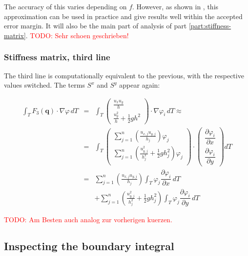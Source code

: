 \documentclass{article}
\newcommand{\todo}[2][]{\textcolor{red}{TODO\ifthenelse{\equal{#1}{}}{}{[#1]}: #2}}
\newcommand{\pd}[2]{\dfrac{\partial #1}{\partial #2}}
\renewcommand{\phi}{\varphi}
\begin{document}
The accuracy of this varies depending on $f$. However, as shown in \cite{cockburn1999discontinuous}, this approximation can be used in practice and give results well within the accepted error margin. It will also be the main part of analysis of part \ref{part:stiffness-matrix}.
\todo{Sehr schoen geschrieben!}

\subsubsection{Stiffness matrix, third line}

The third line is computationally equivalent to the previous, with the respective values switched. The terms $S^x$ and $S^y$ appear again:

\begin{eqnarray*}
  \int_T F_3\left(\mathbf{q}\right) \cdot \nabla \phi \, dT & = &
  \int_T
  \begin{pmatrix}
    \frac{u_x u_y}{h} \\ \frac{u_y^2}{h} + \frac{1}{2} g h^2
  \end{pmatrix}
  \cdot \nabla \phi_i \, dT \approx \\
  & = & \int_T
  \begin{pmatrix}
    \sum_{j=1}^n \left(\frac{u_{x,j} u_{y,j}}{h_j}\right) \phi_j \\
    \sum_{j=1}^n \left(\frac{u_{y,j}^2}{h_j^2} + \frac{1}{2} g h_j^2\right) \phi_j \\
  \end{pmatrix}
  \cdot
  \begin{pmatrix}
    \pd{\phi_i}{x} \\
    \pd{\phi_i}{y}
  \end{pmatrix} dT \\
  & = & \sum_{j=1}^n \left(\frac{u_{x,j} u_{y,j}}{h_j}\right) \int_T \phi_j \pd{\phi_i}{x} \, dT \\
  & {} & + \sum_{j=1}^n \left(\frac{u_{y,j}^2}{h_j^2} + \frac{1}{2} g h_j^2\right) \int_T \phi_j \pd{\phi_i}{y} \, dT
\end{eqnarray*}

\todo{Am Besten auch analog zur vorherigen kuerzen.}

\subsection{Inspecting the boundary integral}
\label{sec:boundary-integral}
\end{document}
